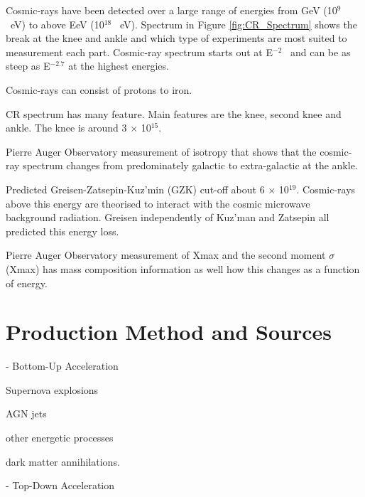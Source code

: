 Cosmic-rays have been detected over a large range of energies from GeV (10$^9$ \ eV) to above EeV (10$^18$ \ eV). Spectrum in Figure \ref{fig:CR_Spectrum} shows the break at the knee and ankle and which type of experiments are most suited to measurement each part. Cosmic-ray spectrum starts out at E$^{-2}$ \ and can be as steep as E$^{-2.7}$ at the highest energies.

Cosmic-rays can consist of protons to iron. 

CR spectrum has many feature. Main features are the knee, second knee and ankle. The knee is around 3 $\times$ 10$^{15}$.

Pierre Auger Observatory measurement of isotropy that shows that the cosmic-ray spectrum changes from predominately galactic to extra-galactic at the ankle.

Predicted Greisen-Zatsepin-Kuz’min (GZK) cut-off about 6 $\times$ 10$^{19}$. Cosmic-rays above this energy are theorised to interact with the cosmic microwave background radiation. Greisen independently of Kuz'man and Zatsepin all predicted this energy loss.

Pierre Auger Observatory measurement of Xmax and the second moment $\sigma$(Xmax) has mass composition information as well how this changes as a function of energy.

\section{Production Method and Sources}

- Bottom-Up Acceleration 

Supernova explosions 

AGN jets

other energetic processes

dark matter annihilations.

- Top-Down Acceleration